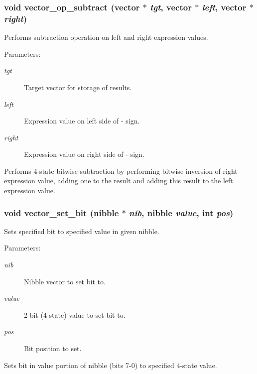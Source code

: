 \subsubsection{\setlength{\rightskip}{0pt plus 5cm}void vector\_\-op\_\-subtract ({\bf vector} $\ast$ {\em tgt}, {\bf vector} $\ast$ {\em left}, {\bf vector} $\ast$ {\em right})}\label{vector_8h_a27}


Performs subtraction operation on left and right expression values.

\begin{Desc}
\item[Parameters: ]\par
\begin{description}
\item[{\em 
tgt}]Target vector for storage of results. \item[{\em 
left}]Expression value on left side of - sign. \item[{\em 
right}]Expression value on right side of - sign.\end{description}
\end{Desc}
Performs 4-state bitwise subtraction by performing bitwise inversion of right expression value, adding one to the result and adding this result to the left expression value. 
\subsubsection{\setlength{\rightskip}{0pt plus 5cm}void vector\_\-set\_\-bit ({\bf nibble} $\ast$ {\em nib}, {\bf nibble} {\em value}, int {\em pos})}\label{vector_8h_a11}


Sets specified bit to specified value in given nibble.

\begin{Desc}
\item[Parameters: ]\par
\begin{description}
\item[{\em 
nib}]Nibble vector to set bit to. \item[{\em 
value}]2-bit (4-state) value to set bit to. \item[{\em 
pos}]Bit position to set.\end{description}
\end{Desc}
Sets bit in value portion of nibble (bits 7-0) to specified 4-state value. 
